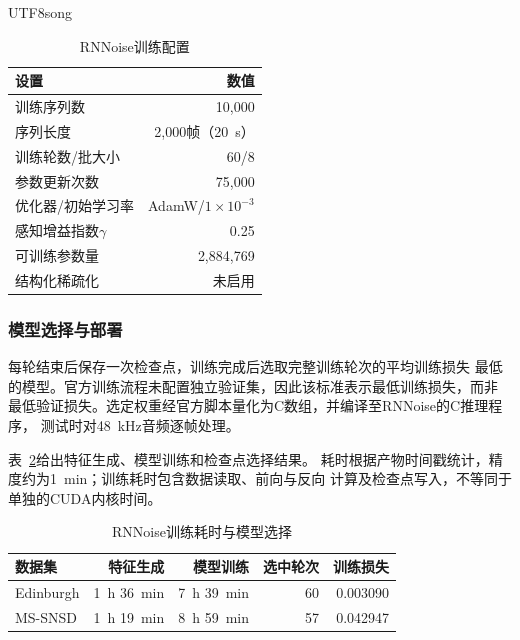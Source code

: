 \documentclass[10.5pt,compsoc]{CjC}
\theoremstyle{mystyle}
\begin{document}
\begin{CJK*}{UTF8}{song}
\begin{table}[htbp]
\centering
\caption{RNNoise训练配置}
\label{tab:rnnoise-config}
\vspace{1mm}
{
\renewcommand{\arraystretch}{1.25}
\setlength{\tabcolsep}{5pt}
\begin{tabular}{lr}
\toprule
\addlinespace[1mm]
设置 & 数值 \\
\midrule
训练序列数 & 10,000 \\
序列长度 & 2,000帧（20~s） \\
训练轮数/批大小 & 60/8 \\
参数更新次数 & 75,000 \\
优化器/初始学习率 & AdamW/$1\times10^{-3}$ \\
感知增益指数$\gamma$ & 0.25 \\
可训练参数量 & 2,884,769 \\
结构化稀疏化 & 未启用 \\
\bottomrule
\end{tabular}}
\end{table}

\subsubsection{模型选择与部署}

每轮结束后保存一次检查点，训练完成后选取完整训练轮次的平均训练损失
最低的模型。官方训练流程未配置独立验证集，因此该标准表示最低训练损失，而非
最低验证损失。选定权重经官方脚本量化为C数组，并编译至RNNoise的C推理程序，
测试时对48~kHz音频逐帧处理。

表~\ref{tab:rnnoise-training}给出特征生成、模型训练和检查点选择结果。
耗时根据产物时间戳统计，精度约为1~min；训练耗时包含数据读取、前向与反向
计算及检查点写入，不等同于单独的CUDA内核时间。

\begin{table}[htbp]
\centering
\caption{RNNoise训练耗时与模型选择}
\label{tab:rnnoise-training}
\vspace{1mm}
{
\renewcommand{\arraystretch}{1.25}
\setlength{\tabcolsep}{8pt}
\begin{tabular}{lrrrr}
\toprule
\addlinespace[1mm]
数据集 & 特征生成 & 模型训练 & 选中轮次 & 训练损失 \\
\midrule
Edinburgh & 1~h 36~min & 7~h 39~min & 60 & 0.003090 \\
MS-SNSD & 1~h 19~min & 8~h 59~min & 57 & 0.042947 \\
\bottomrule
\end{tabular}}
\end{table}


\end{CJK*}
\end{document}
